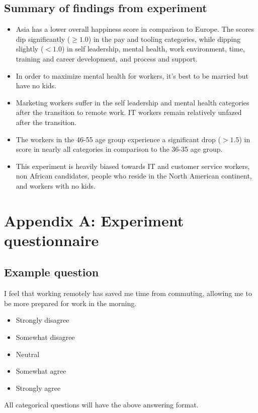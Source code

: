 \documentclass[12pt]{article}
\begin{document}
\subsection*{Summary of findings from experiment}

\begin{itemize}
  \item Asia has a lower overall happiness score in comparison to Europe. The scores dip significantly ($\geq 1.0$) in the pay and tooling categories, while dipping slightly ($< 1.0$) in self leadership, mental health, work environment, time, training and career development, and process and support. 
  \item In order to maximize mental health for workers, it’s best to be married but have no kids.
  \item Marketing workers suffer in the self leadership and mental health categories after the transition to remote work. IT workers remain relatively unfazed after the transition.
  \item The workers in the 46-55 age group experience a significant drop ($> 1.5$) in score in nearly all categories in comparison to the 36-35 age group.
  \item This experiment is heavily biased towards IT and customer service workers, non African candidates, people who reside in the North American continent, and workers with no kids.
\end{itemize}





\appendix
\section*{Appendix A: Experiment questionnaire}

\subsection*{Example question}
I feel that working remotely has saved me time from commuting, allowing me to be more prepared for work in the morning. 
\begin{itemize}
  \item Strongly disagree
  \item Somewhat disagree
  \item Neutral
  \item Somewhat agree
  \item Strongly agree
\end{itemize}
All categorical questions will have the above answering format.
\end{document}
